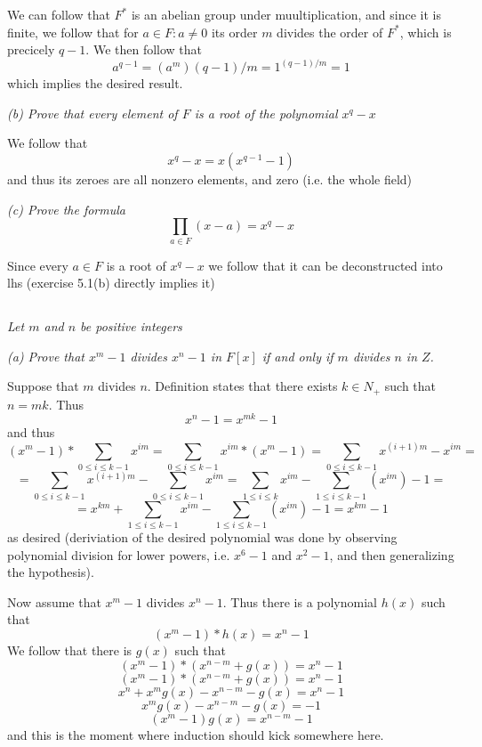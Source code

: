 \documentclass[11pt,oneside,titlepage]{book}
\begin{document}
We can follow that $F^*$ is an abelian group under muultiplication,
and since it is finite, we follow that for $a \in F: a \neq 0$
its order $m$ divides the order of $F^*$, which is precicely $q - 1$.
We then follow that
$$a^{q - 1} = (a^m){(q - 1) / m} = 1^{(q - 1) / m} = 1$$
which implies the desired result.

\textit{(b) Prove that every element of $F$ is a root
  of the polynomial $x^q - x$}

We follow that
$$x^q - x = x(x^{q - 1} - 1)$$
and thus its zeroes are all nonzero elements, and zero
(i.e. the whole field)

\textit{(c) Prove the formula $$\prod_{a \in F}{(x - a)} = x^q - x$$ }

Since every $a \in F$ is a root of $x^q  - x$ we follow that
it can be deconstructed into lhs (exercise 5.1(b) directly implies it)


\subsection{}

\textit{Let $m$ and $n$ be positive integers}

\textit{(a) Prove that $x^m - 1$ divides $x^n - 1$ in $F[x]$ if and
  only if $m$ divides $n$ in $Z$.}

Suppose that $m$ divides $n$. Definition states that there exists
$k \in N_+$ such that $n = mk$. Thus
$$x^n - 1 = x^{mk} - 1$$
and thus
$$(x^m - 1) * \sum_{0 \leq i \leq k - 1}{x^{im}} =
\sum_{0 \leq i \leq k - 1}{x^{im} * (x^m - 1)} =
\sum_{0 \leq i \leq k - 1}{x^{(i + 1)m} - x^{im}} =
$$
$$ =
\sum_{0 \leq i \leq k - 1}{x^{(i + 1)m}} - \sum_{0 \leq i \leq k - 1}{x^{im}} =
\sum_{1 \leq i \leq k}{x^{im}} - \sum_{1 \leq i \leq k - 1}{(x^{im})} - 1 = $$
$$ =
x^{km} + \sum_{1 \leq i \leq k - 1}{x^{im}} - \sum_{1 \leq i \leq k - 1}{(x^{im})} - 1 =
x^{km} - 1
$$
as desired (deriviation of the desired polynomial was done by
observing polynomial division for lower powers, i.e. $x^6 - 1$ and
$x^2 - 1$, and then generalizing the hypothesis).

Now assume that $x^m - 1$ divides $x^n - 1$. Thus there is a polynomial $h(x)$
such that
$$(x^m - 1) * h(x) = x^n - 1$$
We follow that there is $g(x)$ such that
$$(x^m - 1) * (x^{n - m} + g(x)) = x^n - 1$$
$$(x^m - 1) * (x^{n - m} + g(x)) = x^n - 1$$
$$x^n + x^mg(x) - x^{n - m} - g(x)  = x^n - 1$$
$$x^mg(x) - x^{n - m} - g(x)  =  - 1$$
$$(x^m - 1)g(x) = x^{n - m}  - 1$$
and this is the moment where induction should kick somewhere here.
\end{document}
